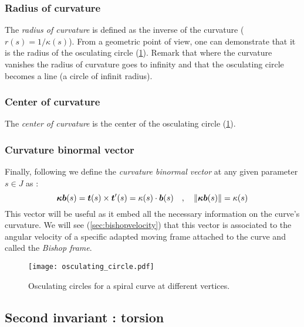 \subsubsection{Radius of curvature}
The \emph{radius of curvature} is defined as the inverse of the curvature ($r(s) = 1/\kappa(s)$). From a geometric point of view, one can demonstrate that it is the radius of the osculating circle (\cref{fig:3_2}). Remark that where the curvature vanishes the radius of curvature goes to infinity and that the osculating circle becomes a line (a circle of infinit radius).

\subsubsection{Center of curvature}
The \emph{center of curvature} is the center of the osculating circle (\cref{fig:3_2}).

\subsubsection{Curvature binormal vector}
Finally, following \cite{Bergou2008} we define the \emph{curvature binormal vector} at any given parameter $s \in J$ as :
\begin{equation}
	\boldsymbol{\kappa b}(s) = \boldsymbol{t}(s) \times \boldsymbol{t}'(s) = \kappa(s)\cdot\boldsymbol{b}(s)
	\quad,\quad
	\|\boldsymbol{\kappa b}(s)\|= \kappa(s)
\end{equation}
This vector will be useful as it embed all the necessary information on the curve's curvature. We will see (\cref{sec:bishopvelocity}) that this vector is associated to the angular velocity of a specific adapted moving frame attached to the curve and called the \emph{Bishop frame}.

\begin{figure}[t]
	\centering
	\texttt{[image: osculating\_circle.pdf]}
	\caption{Osculating circles for a spiral curve at different vertices.}
	\label{fig:3_2}
\end{figure}

\subsection{Second invariant : torsion}\label{sec:torsion}

